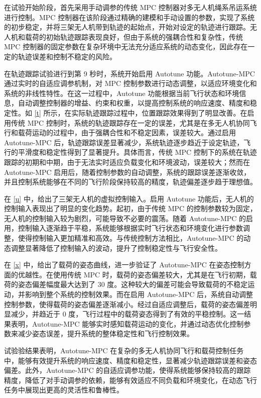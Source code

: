 \documentclass[lang=chs, degree=master, blindreview=true, winfonts=true]{yanputhesis}
\begin{document}
在试验开始阶段，首先采用手动调参的传统 MPC 控制器对多无人机绳系吊运系统进行控制。MPC 控制器在该阶段通过精确的建模和手动设置的参数，实现了系统的初步稳定，并将三架无人机带到轨迹的起始点，开始对设定的轨迹进行跟踪。无人机和载荷的初始轨迹跟踪表现良好，但由于系统的强耦合性和复杂性，传统 MPC 控制器的固定参数在复杂环境中无法充分适应系统的动态变化，因此存在一定的轨迹误差和控制不稳定的风险。

在轨迹跟踪试验进行到第 9 秒时，系统开始启用 Autotune 功能。Autotune-MPC 通过实时的自适应调参机制，对 MPC 控制参数进行动态调整，以适应环境变化和系统的非线性特性。在这一过程中，Autotune 功能根据当前飞行状态和环境信息，自动调整控制器的增益、约束和权重，以提高控制系统的响应速度、精度和稳定性。如 \autoref{t} 所示，在实际轨迹跟踪过程中，位置跟踪效果得到了明显改善。在启用传统 MPC 控制时，系统的轨迹跟踪存在一定的误差，尤其是在多无人机协同飞行和载荷运动的过程中，由于强耦合性和不稳定因素，误差较大。通过启用 Autotune-MPC 后，轨迹跟踪误差显著减少，系统轨迹逐步趋近于设定轨迹，飞行的平滑度和稳定性得到了显著提升。具体而言，传统 MPC 控制下的系统在轨迹跟踪的初期和中期，由于无法实时适应负载变化和环境波动，误差较大；然而在 Autotune-MPC 启用后，随着控制参数的自动调整，系统的跟踪误差逐渐收敛，并且控制系统能够在不同的飞行阶段保持较高的精度，轨迹偏差逐步趋于理想值。

在 \autoref{u} 中，给出了三架无人机的虚拟控制输入。启用 Autotune 功能后，无人机的控制输入表现出了明显的变化趋势。起初，由于传统 MPC 的控制参数较为固定，无人机的控制输入较为剧烈，可能导致不必要的震荡。随着 Autotune-MPC 的启用，控制输入逐渐趋于平稳，系统能够根据实时飞行状态和环境变化进行参数调整，使得控制输入更加精准和高效。与传统控制方法相比，Autotune-MPC 的动态调整显著降低了控制输入的波动，提升了控制稳定性与飞行安全性。

在 \autoref{x} 中，给出了载荷的姿态曲线，进一步验证了 Autotune-MPC 在姿态控制方面的优越性。在使用传统 MPC 时，载荷的姿态偏差较大，尤其是在飞行初期，载荷的姿态偏差幅度最大达到了 30 度。这种较大的偏差可能会导致载荷的不稳定运动，并影响到整个系统的控制效果。而在启用 Autotune-MPC 后，系统自动调整控制参数，使得载荷的姿态偏差逐渐减小。经过自适应调整后，载荷的姿态偏差明显减少，并趋近于 0 度，飞行过程中的载荷姿态得到了有效的平稳控制。这一结果表明，Autotune-MPC 能够实时感知载荷运动的变化，并通过动态优化控制参数来减少姿态误差，提升系统的整体稳定性和飞行控制效果。

试验验结果表明，Autotune-MPC 在复杂的多无人机协同飞行和载荷控制任务中，能够有效提升系统的响应速度、精度和稳定性，显著减少轨迹跟踪误差和姿态偏差。此外，Autotune-MPC 的自适应调参功能，使得系统能够保持较高的跟踪精度，降低了对手动调参的依赖，能够有效适应不同负载和环境变化，在动态飞行任务中展现出更高的灵活性和鲁棒性。
\end{document}
